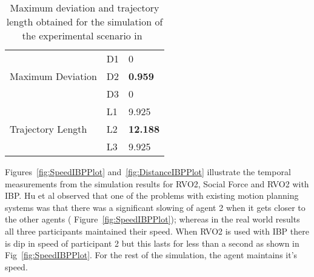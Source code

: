 \begin{table}[h]
\label{tab:RealWorldDistanceDeviation}
\centering
        \begin{tabular}{p{1.5in}   p{0.75in}   p{0.75in}}
            \hline
            \multirow{3}{1.5in}{Maximum Deviation} & \multicolumn{1}{l}{D1} & \multicolumn{1}{l}{0}
            \\%
                                    & \multicolumn{1}{l}{D2} & \multicolumn{1}{l}{\textbf{0.959}}
            \\%
                                    & \multicolumn{1}{l}{D3} & \multicolumn{1}{l}{0}
            \\%

            \hline

            \multirow{3}{1.5in}{Trajectory Length} & \multicolumn{1}{l}{L1} & \multicolumn{1}{l}{9.925}
            \\%
                                    & \multicolumn{1}{l}{L2} & \multicolumn{1}{l}{\textbf{12.188}}
            \\%
                                    & \multicolumn{1}{l}{L3} & \multicolumn{1}{l}{9.925}
            \\%

            \hline
            \hline
        \end{tabular}
    \caption{Maximum deviation and trajectory length obtained for the simulation of the experimental scenario in~\cite{hunanThesis}}
    \label{tab:IBPDistanceDeviation}
\end{table}

Figures~\ref{fig:SpeedIBPPlot} and~\ref{fig:DistanceIBPPlot} illustrate the temporal measurements from the simulation results for RVO2, Social Force and RVO2 with IBP. Hu et al observed that one of the problems with existing motion planning systems was that there was a significant slowing of agent 2 when it gets closer to the other agents ( Figure~\ref{fig:SpeedIBPPlot}); whereas in the real world results all three participants maintained their speed. When RVO2 is used with IBP there is dip in speed of participant 2 but this lasts for less than a second as shown in Fig~\ref{fig:SpeedIBPPlot}. For the rest of the simulation, the agent maintains it's speed.

